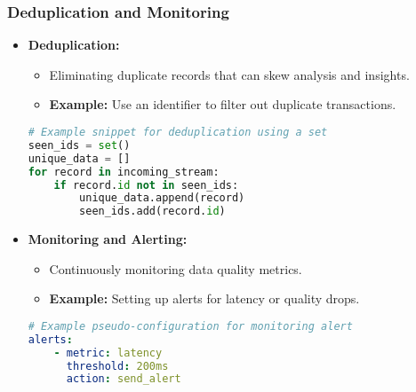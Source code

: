 \documentclass[aspectratio=169]{beamer}
\begin{document}
\begin{frame}[fragile]
    \frametitle{Deduplication and Monitoring}
    \begin{itemize}
        \item \textbf{Deduplication:}
        \begin{itemize}
            \item Eliminating duplicate records that can skew analysis and insights.
            \item \textbf{Example:} Use an identifier to filter out duplicate transactions.
        \end{itemize}
        \begin{lstlisting}[language=Python]
# Example snippet for deduplication using a set
seen_ids = set()
unique_data = []
for record in incoming_stream:
    if record.id not in seen_ids:
        unique_data.append(record)
        seen_ids.add(record.id)
        \end{lstlisting}
        
        \item \textbf{Monitoring and Alerting:}
        \begin{itemize}
            \item Continuously monitoring data quality metrics.
            \item \textbf{Example:} Setting up alerts for latency or quality drops.
        \end{itemize}
        \begin{lstlisting}[language=yaml]
# Example pseudo-configuration for monitoring alert
alerts:
    - metric: latency
      threshold: 200ms
      action: send_alert
        \end{lstlisting}
    \end{itemize}
\end{frame}
\end{document}
